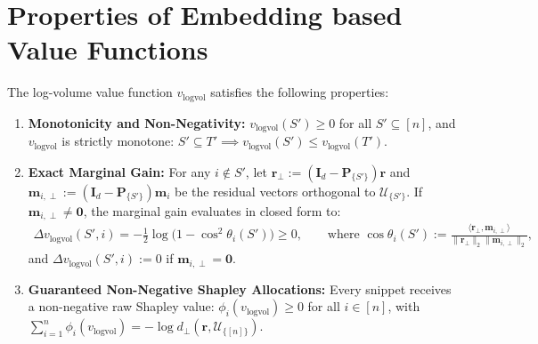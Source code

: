 \newpage
\appendix 

\section{Properties of Embedding based Value Functions}
\label{app:prop_emb}

\begin{proposition}\label{prop:v_logvol}
The log-volume value function $v_{\text{logvol}}$ satisfies the following properties:
\begin{enumerate}
    \item \textbf{Monotonicity and Non-Negativity:} $v_{\text{logvol}}(S') \ge 0$ for all $S' \subseteq [n]$, and $v_{\text{logvol}}$ is strictly monotone: $S' \subseteq T' \implies v_{\text{logvol}}(S') \le v_{\text{logvol}}(T')$.
    \item \textbf{Exact Marginal Gain:} For any $i \notin S'$, let $\mathbf{r}_{\perp} := (\mathbf{I}_d - \mathbf{P}_{\{S'\}})\mathbf{r}$ and $\mathbf{m}_{i, \perp} := (\mathbf{I}_d - \mathbf{P}_{\{S'\}})\mathbf{m}_i$ be the residual vectors orthogonal to $\mathcal{U}_{\{S'\}}$. If $\mathbf{m}_{i, \perp} \neq \mathbf{0}$, the marginal gain evaluates in closed form to:
    \begin{align}\label{eq:marginal_logvol}
        \Delta v_{\text{logvol}}(S', i) = -\frac{1}{2} \log\big(1 - \cos^2 \theta_i(S')\big) \ge 0, \qquad \text{where } \cos \theta_i(S') := \frac{\langle \mathbf{r}_{\perp}, \mathbf{m}_{i, \perp} \rangle}{\|\mathbf{r}_{\perp}\|_2 \|\mathbf{m}_{i, \perp}\|_2},
    \end{align}
    and $\Delta v_{\text{logvol}}(S', i) := 0$ if $\mathbf{m}_{i, \perp} = \mathbf{0}$.
    \item \textbf{Guaranteed Non-Negative Shapley Allocations:} Every snippet receives a non-negative raw Shapley value: $\phi_i(v_{\text{logvol}}) \ge 0$ for all $i \in [n]$, with $\sum_{i=1}^n \phi_i(v_{\text{logvol}}) = -\log d_{\perp}(\mathbf{r}, \mathcal{U}_{\{[n]\}})$.
\end{enumerate}
\end{proposition}

